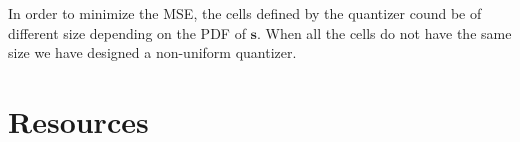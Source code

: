 In order to minimize the MSE, the cells defined by the quantizer cound
be of different size depending on the PDF of ${\mathbf s}$. When all
the cells do not have the same size we have designed a non-uniform
quantizer.

\section{Resources}

